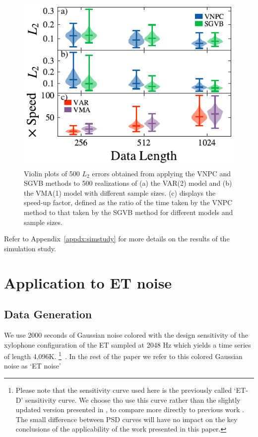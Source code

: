 \documentclass[%
 reprint,
 amsmath,amssymb,
 aps,
 nofootinbib,
]{revtex4-2}
\begin{document}
\begin{figure}
  \includegraphics[width=\columnwidth]{sim_error_violins.pdf}
  \caption{Violin plots of 500 $L_2$ errors obtained from applying the VNPC and \ac{SGVB} methods to 500 realizations of (a) the VAR(2) model and (b) the VMA(1) model with different sample sizes. (c) displays the speed-up factor, defined as the ratio of the time taken by the VNPC method to that taken by the \ac{SGVB} method for different models and sample sizes.}
  \label{fig:sim_error_violins}
\end{figure}
 
Refer to Appendix~\ref{appdx:simstudy} for more details on the results of the simulation study. 




\section{Application to ET noise}
\label{sec:application}
\subsection{Data Generation}
\label{sec:data_gen}

We use 2000 seconds of  Gaussian noise colored with the design sensitivity of the xylophone configuration of the ET sampled at 2048 Hz which yields a time series of length 4,096K.  
\footnote{Please note that the sensitivity curve used here is the previously called `ET-D' sensitivity curve. We choose tho use this curve rather than the slightly updated version presented in \cite{Branchesi:2023mws}, to compare more directly to previous work \cite{Janssens2023}. The small difference between PSD curves will have no impact on the key conclusions of the applicability of the work presented in this paper.}~\cite{Hild_2009,Hild:2010id}. 
In the rest of the
paper we refer to this colored Gaussian noise as `ET noise' 
\end{document}

